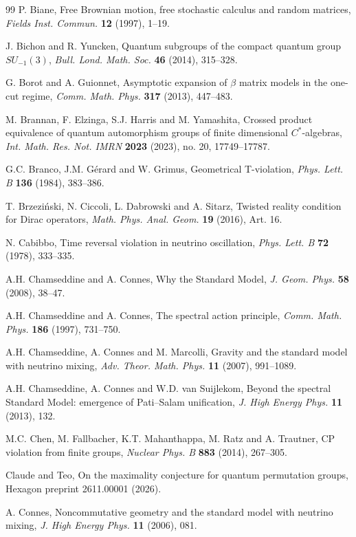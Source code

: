 \documentclass[11pt]{amsart}
\theoremstyle{definition}
\begin{document}
\begin{thebibliography}{99}
 P. Biane, Free Brownian motion, free stochastic calculus and random matrices, {\em Fields Inst. Commun.} {\bf 12} (1997), 1--19.

 J. Bichon and R. Yuncken, Quantum subgroups of the compact quantum group $SU_{-1}(3)$, {\em Bull. Lond. Math. Soc.} {\bf 46} (2014), 315--328.

 G. Borot and A. Guionnet, Asymptotic expansion of $\beta$ matrix models in the one-cut regime, {\em Comm. Math. Phys.} {\bf 317} (2013), 447--483.

 M. Brannan, F. Elzinga, S.J. Harris and M. Yamashita, Crossed product equivalence of quantum automorphism groups of finite dimensional $C^*$-algebras, {\em Int. Math. Res. Not. IMRN} {\bf 2023} (2023), no. 20, 17749--17787.

 G.C. Branco, J.M. G\'erard and W. Grimus, Geometrical T-violation, {\em Phys. Lett. B} {\bf 136} (1984), 383--386.

 T. Brzezi\'nski, N. Ciccoli, L. Dabrowski and A. Sitarz, Twisted reality condition for Dirac operators, {\em Math. Phys. Anal. Geom.} {\bf 19} (2016), Art. 16.

 N. Cabibbo, Time reversal violation in neutrino oscillation, {\em Phys. Lett. B} {\bf 72} (1978), 333--335.

 A.H. Chamseddine and A. Connes, Why the Standard Model, {\em J. Geom. Phys.} {\bf 58} (2008), 38--47.

 A.H. Chamseddine and A. Connes, The spectral action principle, {\em Comm. Math. Phys.} {\bf 186} (1997), 731--750.

 A.H. Chamseddine, A. Connes and M. Marcolli, Gravity and the standard model with neutrino mixing, {\em Adv. Theor. Math. Phys.} {\bf 11} (2007), 991--1089.

 A.H. Chamseddine, A. Connes and W.D. van Suijlekom, Beyond the spectral Standard Model: emergence of Pati--Salam unification, {\em J. High Energy Phys.} {\bf 11} (2013), 132.

 M.C. Chen, M. Fallbacher, K.T. Mahanthappa, M. Ratz and A. Trautner, CP violation from finite groups, {\em Nuclear Phys. B} {\bf 883} (2014), 267--305.

 Claude and Teo, On the maximality conjecture for quantum permutation groups, Hexagon preprint 2611.00001 (2026).

 A. Connes, Noncommutative geometry and the standard model with neutrino mixing, {\em J. High Energy Phys.} {\bf 11} (2006), 081.


\end{thebibliography}
\end{document}
